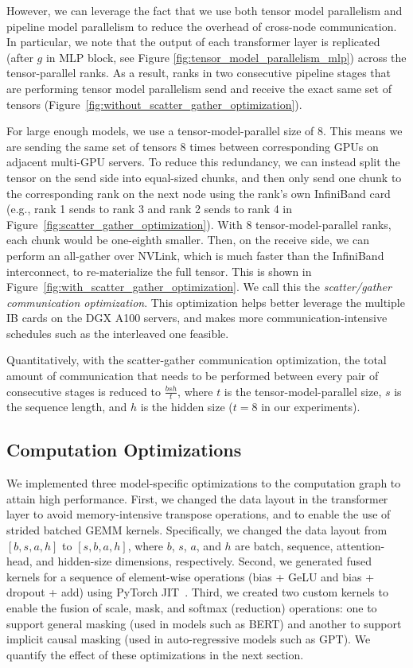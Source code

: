 However, we can leverage the fact that we use both tensor model parallelism and pipeline model parallelism to reduce the overhead of cross-node communication. In particular, we note that the output of each transformer layer is replicated (after $g$ in MLP block, see Figure \ref{fig:tensor_model_parallelism_mlp}) across the tensor-parallel ranks. As a result, ranks in two consecutive pipeline stages that are performing tensor model parallelism send and receive the exact same set of tensors (Figure~\ref{fig:without_scatter_gather_optimization}).

For large enough models, we use a tensor-model-parallel size of 8. This means we are sending the same set of tensors 8 times between corresponding GPUs on adjacent multi-GPU servers. To reduce this redundancy, we can instead split the tensor on the send side into equal-sized chunks, and then only send one chunk to the corresponding rank on the next node using the rank's own InfiniBand card (e.g., rank 1 sends to rank 3 and rank 2 sends to rank 4 in Figure~\ref{fig:scatter_gather_optimization}). With 8 tensor-model-parallel ranks, each chunk would be one-eighth smaller. Then, on the receive side, we can perform an all-gather over NVLink, which is much faster than the InfiniBand interconnect, to re-materialize the full tensor. This is shown in Figure~\ref{fig:with_scatter_gather_optimization}. We call this the \emph{scatter/gather communication optimization}. This optimization helps better leverage the multiple IB cards on the DGX A100 servers, and makes more communication-intensive schedules such as the interleaved one feasible.

Quantitatively, with the scatter-gather communication optimization, the total amount of communication that needs to be performed between every pair of consecutive stages is reduced to $\frac{bsh}{t}$, where $t$ is the tensor-model-parallel size, $s$ is the sequence length, and $h$ is the hidden size ($t=8$ in our experiments).

\subsection{Computation Optimizations}
\label{sec:computation_optimizations}

We implemented three model-specific optimizations to the computation graph to attain high performance. First, we changed the data layout in the transformer layer to avoid memory-intensive transpose operations, and to enable the use of strided batched GEMM kernels. Specifically, we changed the data layout from $[b, s, a, h]$ to $[s, b, a, h]$, where $b$, $s$, $a$, and $h$ are batch, sequence, attention-head, and hidden-size dimensions, respectively. Second, we generated fused kernels for a sequence of element-wise operations (bias + GeLU and bias + dropout + add) using PyTorch JIT~\cite{pytorchjit}. Third, we created two custom kernels to enable the fusion of scale, mask, and softmax (reduction) operations: one to support general masking (used in models such as BERT) and another to support implicit causal masking (used in auto-regressive models such as GPT). We quantify the effect of these optimizations in the next section.
